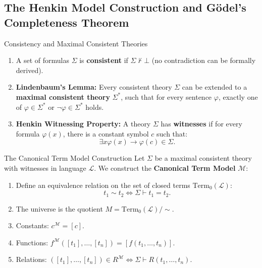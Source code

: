 \subsection{The Henkin Model Construction and G\"odel's Completeness Theorem}

\begin{definitionbox}{Consistency and Maximal Consistent Theories}
\begin{enumerate}[leftmargin=1.4em,itemsep=2pt]
  \item A set of formulas $\Sigma$ is \textbf{consistent} if $\Sigma \nvdash \bot$ (no contradiction can be formally derived).
  \item \textbf{Lindenbaum's Lemma:} Every consistent theory $\Sigma$ can be extended to a \textbf{maximal consistent theory} $\Sigma^*$, such that for every sentence $\varphi$, exactly one of $\varphi \in \Sigma^*$ or $\neg \varphi \in \Sigma^*$ holds.
  \item \textbf{Henkin Witnessing Property:} A theory $\Sigma$ has \textbf{witnesses} if for every formula $\varphi(x)$, there is a constant symbol $c$ such that:
  \[
  \exists x \varphi(x) \to \varphi(c) \in \Sigma.
  \]
\end{enumerate}
\end{definitionbox}

\begin{theorembox}{The Canonical Term Model Construction}
Let $\Sigma$ be a maximal consistent theory with witnesses in language $\mathcal{L}$.
We construct the \textbf{Canonical Term Model} $\mathcal{M}$:
\begin{enumerate}[leftmargin=1.4em,itemsep=2pt]
  \item Define an equivalence relation on the set of closed terms $\mathrm{Term}_0(\mathcal{L})$:
  \[
  t_1 \sim t_2 \iff \Sigma \vdash t_1 = t_2.
  \]
  \item The universe is the quotient $M = \mathrm{Term}_0(\mathcal{L}) / \sim$.
  \item Constants: $c^\mathcal{M} = [c]$.
  \item Functions: $f^\mathcal{M}([t_1], \dots, [t_n]) = [f(t_1, \dots, t_n)]$.
  \item Relations: $([t_1], \dots, [t_n]) \in R^\mathcal{M} \iff \Sigma \vdash R(t_1, \dots, t_n)$.
\end{enumerate}
\end{theorembox}

